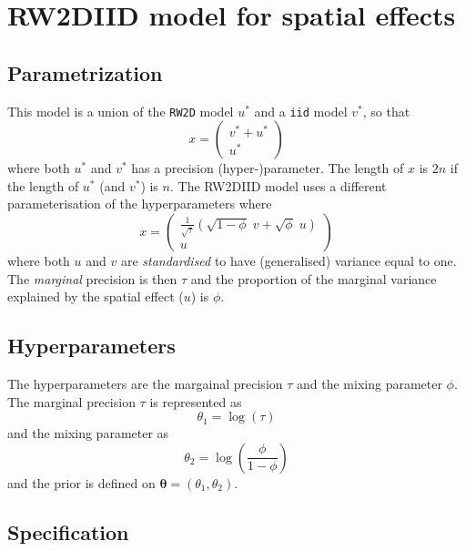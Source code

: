 \documentclass[a4paper,11pt]{article}
\begin{document}
\section*{RW2DIID model for spatial effects}

\subsection*{Parametrization}

This model is a union of the \lstinline$RW2D$ model $u^{*}$ and a
\lstinline$iid$ model $v^{*}$, so that
\begin{displaymath}
    x =
    \begin{pmatrix}
        v^{*} + u^{*}\\
        u^{*}
    \end{pmatrix}
\end{displaymath}
where both $u^{*}$ and $v^{*}$ has a precision (hyper-)parameter.  The
length of $x$ is $2n$ if the length of $u^{*}$ (and $v^{*}$) is
$n$. The RW2DIID model uses a different parameterisation of the
hyperparameters where
\begin{displaymath}
    x =
    \begin{pmatrix}
        \frac{1}{\sqrt{\tau}}\left(\sqrt{1-\phi} \;v +
          \sqrt{\phi} \;u\right)\\
        u
    \end{pmatrix}
\end{displaymath}
where both $u$ and $v$ are \emph{standardised} to have (generalised)
variance equal to one.  The \emph{marginal} precision is then $\tau$
and the proportion of the marginal variance explained by the spatial
effect ($u$) is $\phi$.

\subsection*{Hyperparameters}
The hyperparameters are the margainal precision $\tau$ and the mixing
parameter $\phi$.  The marginal precision $\tau$ is represented as
\begin{displaymath}
    \theta_{1} = \log(\tau)
\end{displaymath}
and the mixing parameter as
\begin{displaymath}
    \theta_{2} = \log\left(\frac{\phi}{1-\phi}\right)
\end{displaymath}
and the prior is defined on $\mathbf{\theta} = (\theta_{1}, \theta_{2})$.

\subsection*{Specification}
\end{document}
